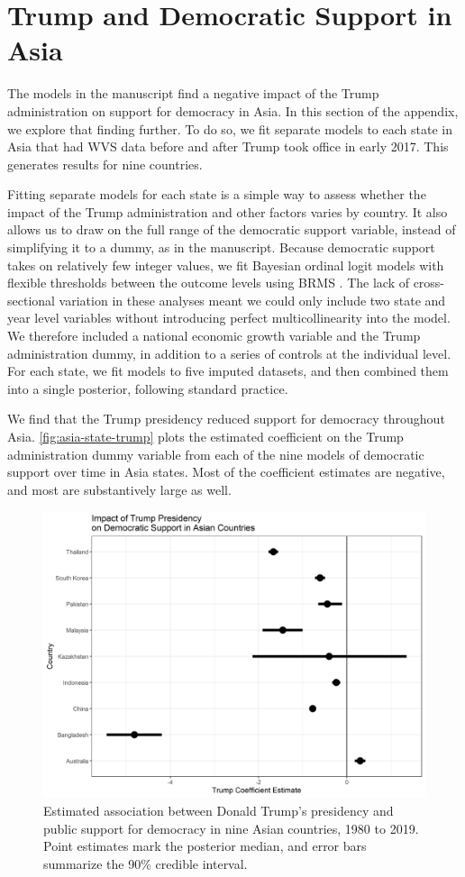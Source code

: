 \documentclass[12pt]{article}
\begin{document}
\section{Trump and Democratic Support in Asia}

The models in the manuscript find a negative impact of the Trump administration on support for democracy in Asia. 
In this section of the appendix, we explore that finding further. 
To do so, we fit separate models to each state in Asia that had WVS data before and after Trump took office in early 2017. 
This generates results for nine countries. 


Fitting separate models for each state is a simple way to assess whether the impact of the Trump administration and other factors varies by country. 
It also allows us to draw on the full range of the democratic support variable, instead of simplifying it to a dummy, as in the manuscript. 
Because democratic support takes on relatively few integer values, we fit Bayesian ordinal logit models with flexible thresholds between the outcome levels using BRMS \citep{Buerkner2017}.
The lack of cross-sectional variation in these analyses meant we could only include two state and year level variables without introducing perfect multicollinearity into the model. 
We therefore included a national economic growth variable and the Trump administration dummy, in addition to a series of controls at the individual level. 
For each state, we fit models to five imputed datasets, and then combined them into a single posterior, following standard practice. 


We find that the Trump presidency reduced support for democracy throughout Asia. 
\autoref{fig:asia-state-trump} plots the estimated coefficient on the Trump administration dummy variable from each of the nine models of democratic support over time in Asia states. 
Most of the coefficient estimates are negative, and most are substantively large as well. 


\begin{figure}
\includegraphics[width = .95\textwidth]{asia-state-trump.png}
\caption{Estimated association between Donald Trump's presidency and public support for democracy in nine Asian countries, 1980 to 2019. Point estimates mark the posterior median, and error bars summarize the 90\% credible interval.}
\label{fig:asia-state-trump} 
\end{figure}
\end{document}
